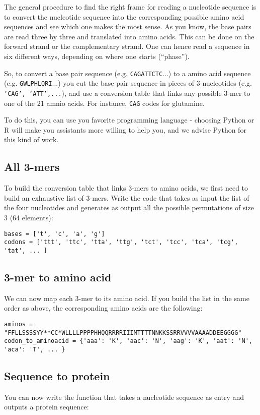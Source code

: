 \documentclass[a4paper,11pt]{article}
\begin{document}
The general procedure to find the right frame for reading a nucleotide sequence is to convert the nucleotide sequence into the corresponding possible amino acid sequences and see which one makes the most sense. As you know, the base pairs are read three by three and translated into amino acids. This can be done on the forward strand or the complementary strand. One can hence read a sequence in six different ways, depending on where one starts (``phase'').

So, to convert a base pair sequence (e.g. \texttt{CAGATTCTC}...) to a amino acid sequence (e.g. \texttt{GWLPHLQRI}...) you cut the base pair sequence in pieces of 3 nucleotides (e.g. \texttt{`CAG', `ATT',...}), and use a conversion table that links any possible 3-mer to one of the 21 amnio acids. For instance, \texttt{CAG} codes for glutamine.

To do this, you can use you favorite programming language - choosing Python or R will make you assistants more willing to help you, and we advise Python for this kind of work.

\subsection{All 3-mers}
To build the conversion table that links 3-mers to amino acids, we first need to build an exhaustive list of 3-mers. Write the code that takes as input the list of the four nucleotides and generates as output all the possible permutations of size 3 (64 elements):
	
\begin{verbatim}
bases = ['t', 'c', 'a', 'g']
codons = ['ttt', 'ttc', 'tta', 'ttg', 'tct', 'tcc', 'tca', 'tcg', 'tat', ... ]
\end{verbatim}

\subsection{3-mer to amino acid}
We can now map each 3-mer to its amino acid. If you build the list in the same order as above, the corresponding amino acids are the following:

\begin{verbatim}
aminos = "FFLLSSSSYY**CC*WLLLLPPPPHHQQRRRRIIIMTTTTNNKKSSRRVVVVAAAADDEEGGGG"
codon_to_aminoacid = {'aaa': 'K', 'aac': 'N', 'aag': 'K', 'aat': 'N', 'aca': 'T', ... }
\end{verbatim}

\subsection{Sequence to protein}
You can now write the function that takes a nucleotide sequence as entry and outputs a protein sequence:
\end{document}
